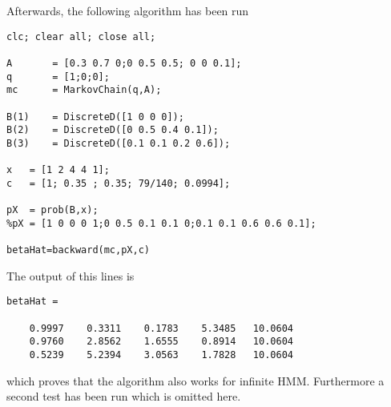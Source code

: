 Afterwards, the following algorithm has been run
\begin{lstlisting}
clc; clear all; close all;

A       = [0.3 0.7 0;0 0.5 0.5; 0 0 0.1];
q       = [1;0;0];
mc      = MarkovChain(q,A);

B(1)    = DiscreteD([1 0 0 0]);
B(2)    = DiscreteD([0 0.5 0.4 0.1]);
B(3)    = DiscreteD([0.1 0.1 0.2 0.6]);

x   = [1 2 4 4 1];
c   = [1; 0.35 ; 0.35; 79/140; 0.0994];

pX  = prob(B,x);
%pX = [1 0 0 0 1;0 0.5 0.1 0.1 0;0.1 0.1 0.6 0.6 0.1];

betaHat=backward(mc,pX,c)
\end{lstlisting} 
The output of this lines is
\begin{lstlisting}
betaHat =

    0.9997    0.3311    0.1783    5.3485   10.0604
    0.9760    2.8562    1.6555    0.8914   10.0604
    0.5239    5.2394    3.0563    1.7828   10.0604
\end{lstlisting}
which proves that the algorithm also works for infinite HMM. Furthermore a second test has been run which is omitted here.
